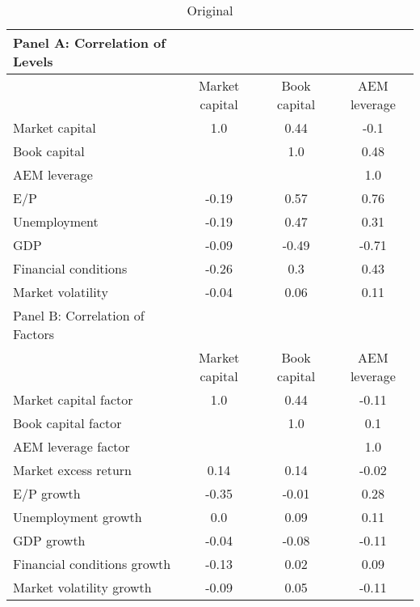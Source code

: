 
    \begin{table}[htbp]
    \centering
    \caption{\label{tab:correlation}Original}
    \begin{adjustbox}{max width=\textwidth}
    \small
    \begin{tabular}{lccc}
        \toprule
        Panel A: Correlation of Levels \\
        \midrule
         & Market capital & Book capital & AEM leverage \\
        \midrule
        Market capital & 1.0 & 0.44 & -0.1 \\
Book capital &  & 1.0 & 0.48 \\
AEM leverage &  &  & 1.0 \\
E/P & -0.19 & 0.57 & 0.76 \\
Unemployment & -0.19 & 0.47 & 0.31 \\
GDP & -0.09 & -0.49 & -0.71 \\
Financial conditions & -0.26 & 0.3 & 0.43 \\
Market volatility & -0.04 & 0.06 & 0.11 \\
        \midrule
        Panel B: Correlation of Factors \\
        \midrule
         & Market capital & Book capital & AEM leverage \\
        \midrule
        Market capital factor & 1.0 & 0.44 & -0.11 \\
Book capital factor &  & 1.0 & 0.1 \\
AEM leverage factor &  &  & 1.0 \\
Market excess return & 0.14 & 0.14 & -0.02 \\
E/P growth & -0.35 & -0.01 & 0.28 \\
Unemployment growth & 0.0 & 0.09 & 0.11 \\
GDP growth & -0.04 & -0.08 & -0.11 \\
Financial conditions growth & -0.13 & 0.02 & 0.09 \\
Market volatility growth & -0.09 & 0.05 & -0.11 \\
        \bottomrule
    \end{tabular}
    \end{adjustbox}
    \end{table}
    